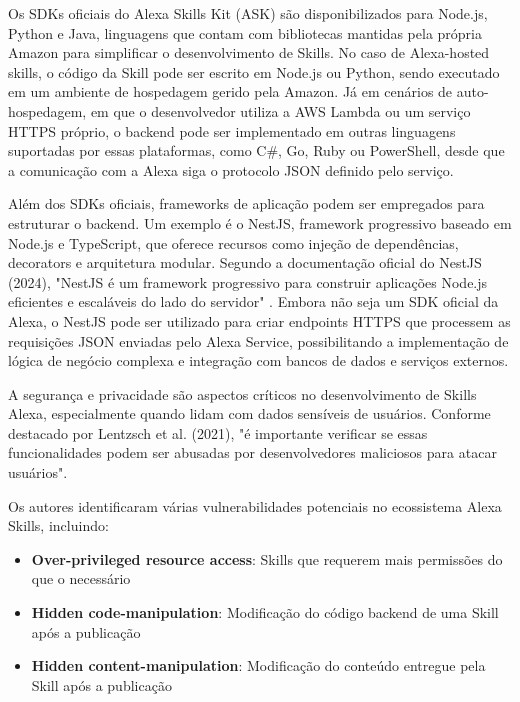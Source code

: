 
Os SDKs oficiais do Alexa Skills Kit (ASK) são disponibilizados para Node.js, Python e Java, linguagens que contam com bibliotecas mantidas pela própria Amazon para simplificar o desenvolvimento de Skills.
No caso de Alexa-hosted skills, o código da Skill pode ser escrito em Node.js ou Python, sendo executado em um ambiente de hospedagem gerido pela Amazon.
Já em cenários de auto-hospedagem, em que o desenvolvedor utiliza a AWS Lambda ou um serviço HTTPS próprio, o backend pode ser implementado em outras linguagens suportadas por essas plataformas, como C\#, Go, Ruby ou PowerShell, desde que a comunicação com a Alexa siga o protocolo JSON definido pelo serviço.

Além dos SDKs oficiais, frameworks de aplicação podem ser empregados para estruturar o backend. Um exemplo é o NestJS, framework progressivo baseado em Node.js e TypeScript, que oferece recursos como injeção de dependências, decorators e arquitetura modular.
Segundo a documentação oficial do NestJS (2024), "NestJS é um framework progressivo para construir aplicações Node.js eficientes e escaláveis do lado do servidor" \cite{nestjs2024}.
Embora não seja um SDK oficial da Alexa, o NestJS pode ser utilizado para criar endpoints HTTPS que processem as requisições JSON enviadas pelo Alexa Service, possibilitando a implementação de lógica de negócio complexa e integração com bancos de dados e serviços externos.


A segurança e privacidade são aspectos críticos no desenvolvimento de Skills Alexa, especialmente quando lidam com dados sensíveis de usuários. 
Conforme destacado por Lentzsch et al. (2021), "é importante verificar se essas funcionalidades podem ser abusadas por desenvolvedores maliciosos para atacar usuários".

Os autores identificaram várias vulnerabilidades potenciais no ecossistema Alexa Skills, incluindo:
\begin{itemize}
    \item \textbf{Over-privileged resource access}: Skills que requerem mais permissões do que o necessário
    \item \textbf{Hidden code-manipulation}: Modificação do código backend de uma Skill após a publicação
    \item \textbf{Hidden content-manipulation}: Modificação do conteúdo entregue pela Skill após a publicação
\end{itemize}

